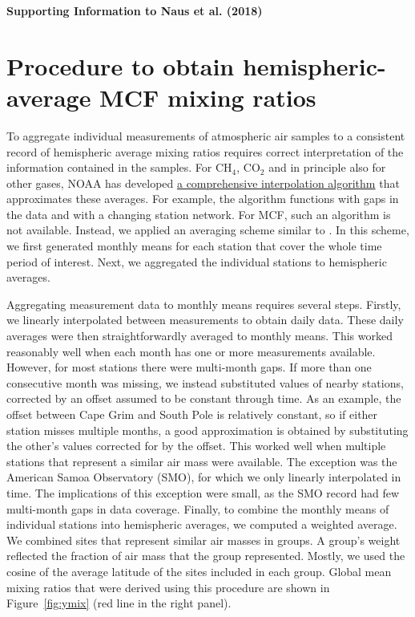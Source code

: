 \documentclass[10pt]{article}
\begin{document}
{\huge \textbf{Supporting Information to Naus et al. (2018)}}


\section{Procedure to obtain hemispheric-average MCF mixing ratios}
\label{sup:pseudo_obs}

To aggregate individual measurements of atmospheric air samples to a consistent record of hemispheric average mixing ratios requires correct interpretation of the information contained in the samples. For CH$_4$, CO$_2$ and in principle also for other gases, NOAA has developed \href{https://www.esrl.noaa.gov/gmd/ccgg/about/global_means.html}{a comprehensive interpolation algorithm} that approximates these averages. For example, the algorithm functions with gaps in the data and with a changing station network. For MCF, such an algorithm is not available. Instead, we applied an averaging scheme similar to \cite{montzka2011}. In this scheme, we first generated monthly means for each station that cover the whole time period of interest. Next, we aggregated the individual stations to hemispheric averages. 

Aggregating measurement data to monthly means requires several steps. Firstly, we linearly interpolated between measurements to obtain daily data. These daily averages were then straightforwardly averaged to monthly means. This worked reasonably well when each month has one or more measurements available. However, for most stations there were multi-month gaps. If more than one consecutive month was missing, we instead substituted values of nearby stations, corrected by an offset assumed to be constant through time. As an example, the offset between Cape Grim and South Pole is relatively constant, so if either station misses multiple months, a good approximation is obtained by substituting the other's values corrected for by the offset. This worked well when multiple stations that represent a similar air mass were available. The exception was the American Samoa Observatory (SMO), for which we only linearly interpolated in time. The implications of this exception were small, as the SMO record had few multi-month gaps in data coverage. Finally, to combine the monthly means of individual stations into hemispheric averages, we computed a weighted average. We combined sites that represent similar air masses in groups. A group's weight reflected the fraction of air mass that the group represented. Mostly, we used the cosine of the average latitude of the sites included in each group. Global mean mixing ratios that were derived using this procedure are shown in Figure~\ref{fig:ymix} (red line in the right panel).
\end{document}
